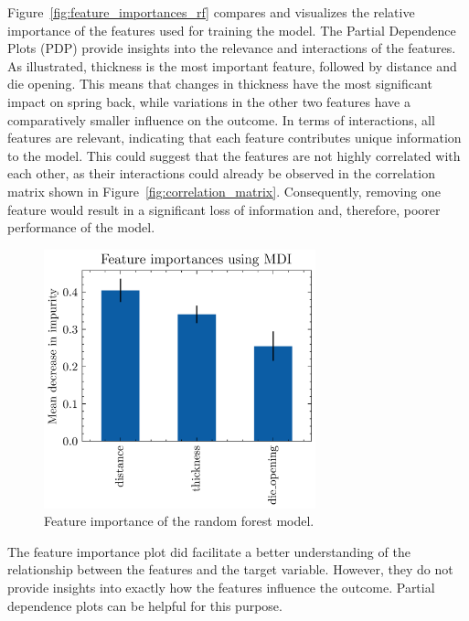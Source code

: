 Figure~\ref{fig:feature_importances_rf} compares and visualizes the relative importance of the features used for
training the model.
The Partial Dependence Plots (PDP) provide insights into the relevance and interactions of the
features.
As illustrated, thickness is the most important feature, followed by distance and die opening.
This means
that changes in thickness have the most significant impact on spring back, while variations in the other two features
have a comparatively smaller influence on the outcome.
In terms of interactions, all features are relevant, indicating that each feature contributes unique information to
the model.
This could suggest that the features are not highly correlated with each other, as their interactions
could already be observed in the correlation matrix shown in Figure~\ref{fig:correlation_matrix}.
Consequently, removing one feature would result in a significant loss of information and, therefore, poorer
performance of the model.

\begin{figure}[h]
    \begin{tcolorbox}[arc=0pt,boxrule=0.5pt]
        \centering
        \includegraphics[width=0.7\textwidth]{chap5/images/rf_feature_importances}
    \end{tcolorbox}
    \caption{Feature importance of the random forest model.}
    \label{fig:feature-importances-rf}
\end{figure}

The feature importance plot did facilitate a better understanding of the relationship between the features and the
target
variable.
However, they do not provide insights into exactly how the features influence the outcome. Partial dependence plots
can be helpful for this purpose.


